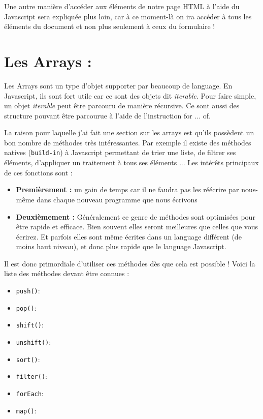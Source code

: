 \documentclass[a4paper, 11pt]{scrartcl}
\begin{document}
Une autre manière d'accéder aux éléments de notre page HTML à l'aide du Javascript sera expliquée plus loin, car à ce moment-là on ira accéder à tous les éléments du document et non plus seulement à ceux du formulaire !

\section{Les Arrays :}

Les Arrays sont un type d'objet supporter par beaucoup de language.  En Javascript, ils sont fort utile car ce sont des objets dit \textit{iterable}.  Pour faire simple, un objet \textit{iterable} peut être parcouru de manière récursive.  Ce sont aussi des structure pouvant être parcourue à l'aide de l'instruction for ... of.  

La raison pour laquelle j'ai fait une section sur les arrays est qu'ils possèdent un bon nombre de méthodes très intéressantes.  Par exemple il existe des méthodes natives (\texttt{build-in}) à Javascript permettant de trier une liste, de filtrer ses éléments, d'appliquer un traitement à tous ses éléments ...  Les intérêts principaux de ces fonctions sont : 

\begin{itemize}
\item \textbf{Premièrement :} un gain de temps car il ne faudra pas les réécrire par nous-même dans chaque nouveau programme que nous écrivons
\item \textbf{Deuxièmement :} Généralement ce genre de méthodes sont optimisées pour être rapide et efficace.  Bien souvent elles seront meilleures que celles que vous écrirez.  Et parfois elles sont même écrites dans un language différent (de moins haut niveau), et donc plus rapide que le language Javascript.  
\end{itemize}

Il est donc primordiale d'utiliser ces méthodes dès que cela est possible ! Voici la liste des méthodes devant être connues :

\begin{itemize}
\item \texttt{push()}:
\item \texttt{pop()}:
\item \texttt{shift()}:
\item \texttt{unshift()}:
\item \texttt{sort()}:
\item \texttt{filter()}:
\item \texttt{forEach}:
\item \texttt{map()}:
\end{itemize}
\end{document}
